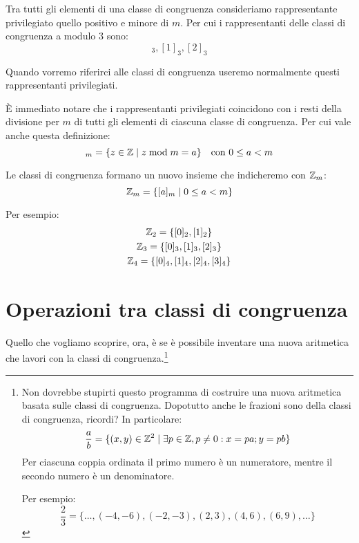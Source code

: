 Tra tutti gli elementi di una classe di congruenza consideriamo rappresentante privilegiato quello positivo e minore di $m$.
Per cui i rappresentanti delle classi di congruenza a modulo 3 sono:
\begin{equation*}
    [0]_3, [1]_3, [2]_3
\end{equation*}

Quando vorremo riferirci alle classi di congruenza useremo normalmente questi rappresentanti privilegiati.

È immediato notare che i rappresentanti privilegiati coincidono con i resti della divisione per $m$ di tutti gli elementi di ciascuna classe di congruenza.
Per cui vale anche questa definizione:
\begin{equation*}
    [a]_m = \{z \in \Z \mid z \modulo m = a\} \quad \text{con } 0 \le a < m
\end{equation*}

Le classi di congruenza formano un nuovo insieme che indicheremo con $ \mathbb{Z} _m$:
\begin{equation*}
     \mathbb{Z} _m= \{ [a]_m \mid 0 \le a < m \}
\end{equation*}

Per esempio:
\begin{gather*}
     \mathbb{Z} _2 = \{[0]_2, [1]_2\} \\
     \mathbb{Z} _3 = \{[0]_3, [1]_3, [2]_3\} \\
     \mathbb{Z} _4 = \{[0]_4, [1]_4, [2]_4, [3]_4\} \\
\end{gather*}

\section{Operazioni tra classi di congruenza}
\label{sec:operazioni_tra_classi_di_congruenza}

Quello che vogliamo scoprire, ora, è se è possibile inventare una nuova aritmetica che lavori con la classi di congruenza.\footnote{Non dovrebbe stupirti questo programma di costruire una nuova aritmetica basata sulle classi di congruenza. Dopotutto anche le frazioni sono della classi di congruenza, ricordi? In particolare:
\begin{equation*}
    \dfrac{a}{b} = \{ (x, y) \in  \mathbb{Z} ^2 \mid \exists p \in  \mathbb{Z} , p \ne 0: x = pa; y = pb\}
\end{equation*}
Per ciascuna coppia ordinata il primo numero è un numeratore, mentre il secondo numero è un denominatore.

Per esempio:
\begin{equation*}
    \dfrac{2}{3} = \{ \dots, (-4, -6), (-2,-3), (2, 3), (4, 6), (6, 9), \dots \}
\end{equation*}
}

